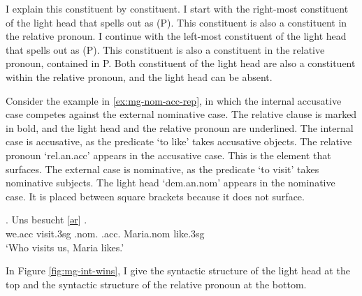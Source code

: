 I explain this constituent by constituent.
I start with the right-most constituent of the light head that spells out as  (P). This constituent is also a constituent in the relative pronoun.
I continue with the left-most constituent of the light head that spells out as  (P). This constituent is also a constituent in the relative pronoun, contained in P.
Both constituent of the light head are also a constituent within the relative pronoun, and the light head can be absent.

Consider the example in \ref{ex:mg-nom-acc-rep}, in which the internal accusative case competes against the external nominative case. The relative clause is marked in bold, and the light head and the relative pronoun are underlined.
The internal case is accusative, as the predicate  `to like' takes accusative objects. The relative pronoun  `\ac{rel}.\ac{an}.\ac{acc}' appears in the accusative case. This is the element that surfaces.
The external case is nominative, as the predicate  `to visit' takes nominative subjects. The light head  `\ac{dem}.\ac{an}.\ac{nom}' appears in the nominative case. It is placed between square brackets because it does not surface.

\exg. Uns besucht [\underline{ər}] \underline{}  .\\
 we.\ac{acc} visit.3\ac{sg}\scsub{[nom]} .\ac{nom}. .\ac{acc}. Maria.\ac{nom} like.3\ac{sg}\scsub{[acc]}\\
 `Who visits us, Maria likes.' \label{ex:mg-nom-acc-rep}

In Figure \ref{fig:mg-int-wins}, I give the syntactic structure of the light head at the top and the syntactic structure of the relative pronoun at the bottom.

